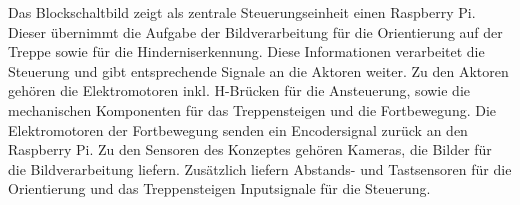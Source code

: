  Das Blockschaltbild zeigt als zentrale Steuerungseinheit einen Raspberry Pi. Dieser übernimmt die Aufgabe der Bildverarbeitung für die Orientierung auf der Treppe sowie für die Hinderniserkennung. Diese Informationen verarbeitet die Steuerung und gibt entsprechende Signale an die Aktoren weiter. Zu den Aktoren gehören die Elektromotoren inkl. H-Brücken für die Ansteuerung, sowie die mechanischen Komponenten für das Treppensteigen und die Fortbewegung. Die Elektromotoren der Fortbewegung senden ein Encodersignal zurück an den Raspberry Pi. Zu den Sensoren des Konzeptes gehören Kameras, die Bilder für die Bildverarbeitung liefern. Zusätzlich liefern Abstands- und Tastsensoren für die Orientierung und das Treppensteigen Inputsignale für die Steuerung.
